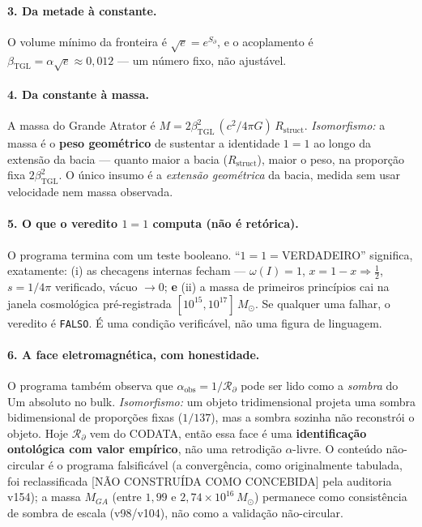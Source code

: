 \documentclass[11pt]{article}
\newcommand{\bTGL}{\beta_{\mathrm{TGL}}}\newcommand{\Msun}{M_{\odot}}\newcommand{\TGL}{\mathrm{TGL}}
\theoremstyle{definition}\newtheorem{deriv}{Derivação}
\begin{document}
\paragraph{3. Da metade à constante.} O volume mínimo da fronteira é $\sqrt e=e^{S_\partial}$, e o acoplamento é $\bTGL=\alpha\sqrt e\approx0{,}012$ --- um número fixo, não ajustável.

\paragraph{4. Da constante à massa.} A massa do Grande Atrator é $M=2\bTGL^2\,(c^2/4\pi G)\,R_{\mathrm{struct}}$. \emph{Isomorfismo:} a massa é o \textbf{peso geométrico} de sustentar a identidade $1=1$ ao longo da extensão da bacia --- quanto maior a bacia ($R_{\mathrm{struct}}$), maior o peso, na proporção fixa $2\bTGL^2$. O único insumo é a \emph{extensão geométrica} da bacia, medida sem usar velocidade nem massa observada.

\paragraph{5. O que o veredito $1=1$ computa (não é retórica).} O programa termina com um teste booleano. ``$1=1=$VERDADEIRO'' significa, exatamente: (i) as checagens internas fecham --- $\omega(I)=1$, $x=1-x\Rightarrow\tfrac12$, $s=1/4\pi$ verificado, vácuo $\to0$; \textbf{e} (ii) a massa de primeiros princípios cai na janela cosmológica pré-registrada $[10^{15},10^{17}]\,\Msun$. Se qualquer uma falhar, o veredito é \texttt{FALSO}. É uma condição verificável, não uma figura de linguagem.

\paragraph{6. A face eletromagnética, com honestidade.} O programa também observa que $\alpha_{\mathrm{obs}}=1/\mathcal{R}_\partial$ pode ser lido como a \emph{sombra} do Um absoluto no bulk. \emph{Isomorfismo:} um objeto tridimensional projeta uma sombra bidimensional de proporções fixas ($1/137$), mas a sombra sozinha não reconstrói o objeto. Hoje $\mathcal{R}_\partial$ vem do CODATA, então essa face é uma \textbf{identificação ontológica com valor empírico}, não uma retrodição $\alpha$-livre. O conteúdo não-circular é o programa falsificável (a convergência, como originalmente tabulada, foi reclassificada [NÃO CONSTRUÍDA COMO CONCEBIDA] pela auditoria v154); a massa $M_{GA}$ (entre $1{,}99$ e $2{,}74\times10^{16}\,\Msun$) permanece como consistência de sombra de escala (v98/v104), não como a validação não-circular.
\end{document}
